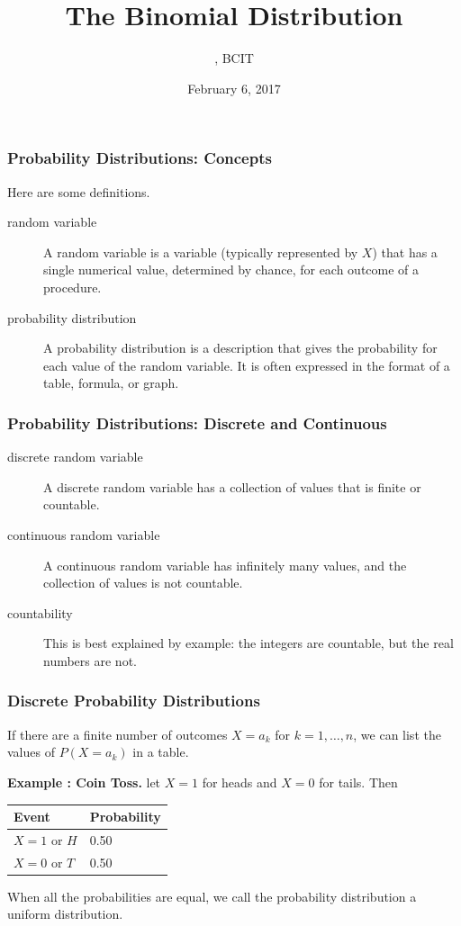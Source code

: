 \documentclass[xcolor=dvipsnames]{beamer}
\title{The Binomial Distribution}
\subtitle{{\CourseNumber}, BCIT}
\author{\CourseName}
\date{February 6, 2017}
\newcounter{expls}
\newcommand{\beispiel}[1]{\refstepcounter{expls}\textbf{Example \arabic{expls}: #1.}}
\begin{document}
\begin{frame}
  \titlepage
\end{frame}

\begin{frame}
  \frametitle{Probability Distributions: Concepts}
Here are some definitions.
\begin{description}
\item[random variable] A random variable is a variable (typically
  represented by $X$) that has a single numerical value, determined by
  chance, for each outcome of a procedure.
\item[probability distribution] A probability distribution is a
  description that gives the probability for each value of the random
  variable. It is often expressed in the format of a table, formula,
  or graph.
\end{description}
\end{frame}

\begin{frame}
  \frametitle{Probability Distributions: Discrete and Continuous}
\begin{description}
\item[discrete random variable] A \alert{discrete} random variable has
  a collection of values that is finite or countable.
\item[continuous random variable] A \alert{continuous} random variable has
  infinitely many values, and the collection of values is not
  countable.
\item[countability] This is best explained by example: the integers
  are countable, but the real numbers are not.
\end{description}
\end{frame}

\begin{frame}
  \frametitle{Discrete Probability Distributions}
  If there are a finite number of outcomes $X=a_{k}$ for
  $k=1,\ldots,n$, we can list the values of $P(X=a_{k})$ in a table. 

\bigskip

\beispiel{Coin Toss}\label{ex:ootiteij} let $X=1$ for heads and $X=0$
for tails. Then 

\bigskip

\begin{tabular}{|l|l|}\hline
  Event & Probability \\ \hline
  $X=1$ or $H$ & 0.50 \\ \hline
  $X=0$ or $T$ & 0.50 \\ \hline
\end{tabular}

\bigskip

When all the probabilities are equal, we call the probability
distribution a \alert{uniform distribution}.
\end{frame}
\end{document}
